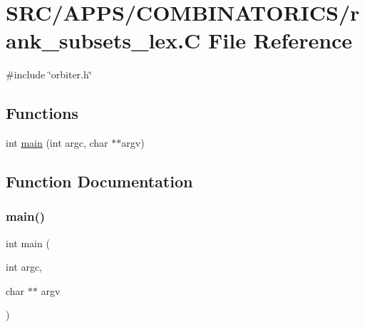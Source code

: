 \hypertarget{rank__subsets__lex_8_c}{}\section{S\+R\+C/\+A\+P\+P\+S/\+C\+O\+M\+B\+I\+N\+A\+T\+O\+R\+I\+C\+S/rank\+\_\+subsets\+\_\+lex.C File Reference}
\label{rank__subsets__lex_8_c}
{\ttfamily \#include \char`\"{}orbiter.\+h\char`\"{}}\newline
\subsection*{Functions}
\begin{DoxyCompactItemize}
\item 
int \mbox{\hyperlink{rank__subsets__lex_8_c_a3c04138a5bfe5d72780bb7e82a18e627}{main}} (int argc, char $\ast$$\ast$argv)
\end{DoxyCompactItemize}


\subsection{Function Documentation}
\mbox{\label{rank__subsets__lex_8_c_a3c04138a5bfe5d72780bb7e82a18e627}} 
\subsubsection{\texorpdfstring{main()}{main()}}
{\footnotesize\ttfamily int main (\begin{DoxyParamCaption}\item[{int}]{argc,  }\item[{char $\ast$$\ast$}]{argv }\end{DoxyParamCaption})}


